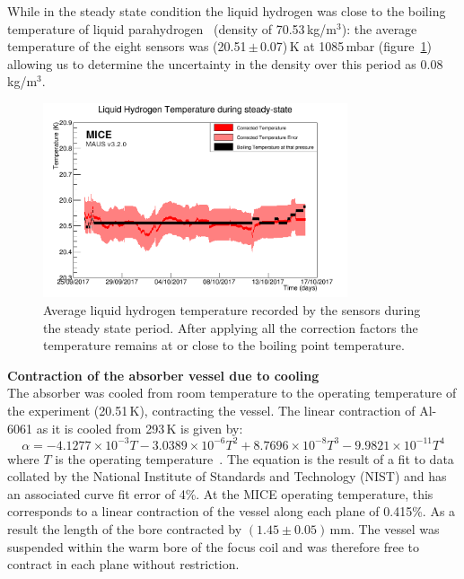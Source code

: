 While in the steady state condition the liquid hydrogen was close to the
boiling temperature of liquid parahydrogen~\cite{NOTE524} (density of 70.53\,kg/m$^{3}$):
the average temperature of the eight sensors was (20.51\,$\mathrm{\pm}$\,0.07)\,K at 1085\,mbar
(figure~\ref{Fig:TempCalibrated}) allowing us to determine the
uncertainty in the density over this period as 0.08\,kg/m$^{3}$. \\
\begin{figure}
  \begin{center}
    \includegraphics[width=0.80\textwidth]{SteadyState60mK_logo.png}
  \end{center}
  \caption{
    Average liquid hydrogen temperature recorded by the sensors during the
    steady state period.
    After applying all the correction factors the temperature remains
    at or close to the boiling point temperature.
  }
  \label{Fig:TempCalibrated}
\end{figure}

\noindent\textbf{Contraction of the absorber vessel due to cooling} \\
\noindent
The absorber was cooled from room temperature to the operating
temperature of the experiment (20.51\,K), contracting the vessel.
The linear contraction of Al-6061 as it is cooled from 293\,K is given
by: 
\begin{equation}
  \alpha =-4.1277\times {10}^{-3}T-3.0389\times {10}^{-6}T^2+8.7696\times {10}^{-8}T^3-9.9821\times {10}^{-11}T^4
\end{equation}
where $T$ is the operating temperature~\cite{Hardin}.
The equation is the result of a fit to data collated by the National
Institute of Standards and Technology (NIST) and has an associated
curve fit error of 4\%. 
At the MICE operating temperature, this corresponds to a linear
contraction of the vessel along each plane of 0.415\%.
As a result the length of the bore contracted by
$(1.45 \pm 0.05)$\,mm.
The vessel was suspended within the warm bore of the focus coil and
was therefore free to contract in each plane without restriction.  \\

